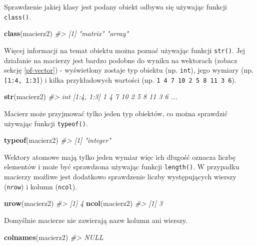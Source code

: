 \documentclass[paper=6in:9in,pagesize=pdftex,headinclude=on,footinclude=on,10pt]{scrbook}
\newenvironment{Shaded}{\begin{snugshade}}{\end{snugshade}}
\newcommand{\CommentTok}[1]{\textcolor[rgb]{0.56,0.35,0.01}{\textit{#1}}}
\newcommand{\KeywordTok}[1]{\textcolor[rgb]{0.13,0.29,0.53}{\textbf{#1}}}
\newcommand{\NormalTok}[1]{#1}
\begin{document}
Sprawdzenie jakiej klasy jest podany obiekt odbywa się używając funkcji \texttt{class()}.

\begin{Shaded}
\begin{Highlighting}[]
\KeywordTok{class}\NormalTok{(macierz2)}
\CommentTok{#> [1] "matrix" "array"}
\end{Highlighting}
\end{Shaded}

Więcej informacji na temat obiektu można poznać używając funkcji \texttt{str()}.
Jej działanie na macierzy jest bardzo podobne do wyniku na wektorach (zobacz sekcję \ref{pf-vector}) - wyświetlony zostaje typ obiektu (np. \texttt{int}), jego wymiary (np. \texttt{{[}1:4,\ 1:3{]}}) i kilka przykładowych wartości (np. \texttt{1\ 4\ 7\ 10\ 2\ 5\ 8\ 11\ 3\ 6}).

\begin{Shaded}
\begin{Highlighting}[]
\KeywordTok{str}\NormalTok{(macierz2)}
\CommentTok{#>  int [1:4, 1:3] 1 4 7 10 2 5 8 11 3 6 ...}
\end{Highlighting}
\end{Shaded}

Macierz może przyjmować tylko jeden typ obiektów, co można sprawdzić używając funkcji \texttt{typeof()}.

\begin{Shaded}
\begin{Highlighting}[]
\KeywordTok{typeof}\NormalTok{(macierz2)}
\CommentTok{#> [1] "integer"}
\end{Highlighting}
\end{Shaded}

Wektory atomowe mają tylko jeden wymiar więc ich długość oznacza liczbę elementów i może być sprawdzona używając funkcji \texttt{length()}.
W przypadku macierzy możliwe jest dodatkowo sprawdzenie liczby występujących wierszy (\texttt{nrow}) i kolumn (\texttt{ncol}).

\begin{Shaded}
\begin{Highlighting}[]
\KeywordTok{nrow}\NormalTok{(macierz2)}
\CommentTok{#> [1] 4}
\KeywordTok{ncol}\NormalTok{(macierz2)}
\CommentTok{#> [1] 3}
\end{Highlighting}
\end{Shaded}

Domyślnie macierze nie zawierają nazw kolumn ani wierszy.

\begin{Shaded}
\begin{Highlighting}[]
\KeywordTok{colnames}\NormalTok{(macierz2)}
\CommentTok{#> NULL}
\end{Highlighting}
\end{Shaded}
\end{document}
